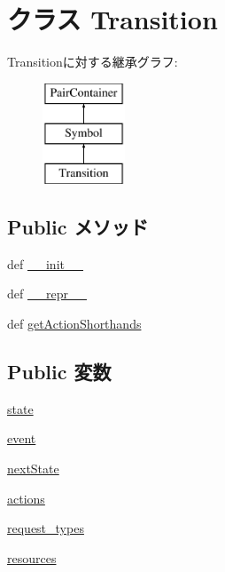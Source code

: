 \hypertarget{classslicc_1_1symbols_1_1Transition_1_1Transition}{
\section{クラス Transition}
\label{classslicc_1_1symbols_1_1Transition_1_1Transition}
}
Transitionに対する継承グラフ:\begin{figure}[H]
\begin{center}
\leavevmode
\includegraphics[height=3cm]{classslicc_1_1symbols_1_1Transition_1_1Transition}
\end{center}
\end{figure}
\subsection*{Public メソッド}
\begin{DoxyCompactItemize}
\item 
def \hyperlink{classslicc_1_1symbols_1_1Transition_1_1Transition_ac775ee34451fdfa742b318538164070e}{\_\-\_\-init\_\-\_\-}
\item 
def \hyperlink{classslicc_1_1symbols_1_1Transition_1_1Transition_ad8b9328939df072e4740cd9a63189744}{\_\-\_\-repr\_\-\_\-}
\item 
def \hyperlink{classslicc_1_1symbols_1_1Transition_1_1Transition_a2e3adf778c94f8bf9825535615c9b9e6}{getActionShorthands}
\end{DoxyCompactItemize}
\subsection*{Public 変数}
\begin{DoxyCompactItemize}
\item 
\hyperlink{classslicc_1_1symbols_1_1Transition_1_1Transition_adc6e5733fc3c22f0a7b2914188c49c90}{state}
\item 
\hyperlink{classslicc_1_1symbols_1_1Transition_1_1Transition_a3b65133bb9997cd1ccf311af0927fc9e}{event}
\item 
\hyperlink{classslicc_1_1symbols_1_1Transition_1_1Transition_ab560d56a80567daae1848f9feaf1de40}{nextState}
\item 
\hyperlink{classslicc_1_1symbols_1_1Transition_1_1Transition_af806efc6052edbc741683ec893bb2fe1}{actions}
\item 
\hyperlink{classslicc_1_1symbols_1_1Transition_1_1Transition_a11a77bd4543c82e1dd96d60507dc74d2}{request\_\-types}
\item 
\hyperlink{classslicc_1_1symbols_1_1Transition_1_1Transition_a715e7b31400aa585643e94e0ba160aab}{resources}
\end{DoxyCompactItemize}



